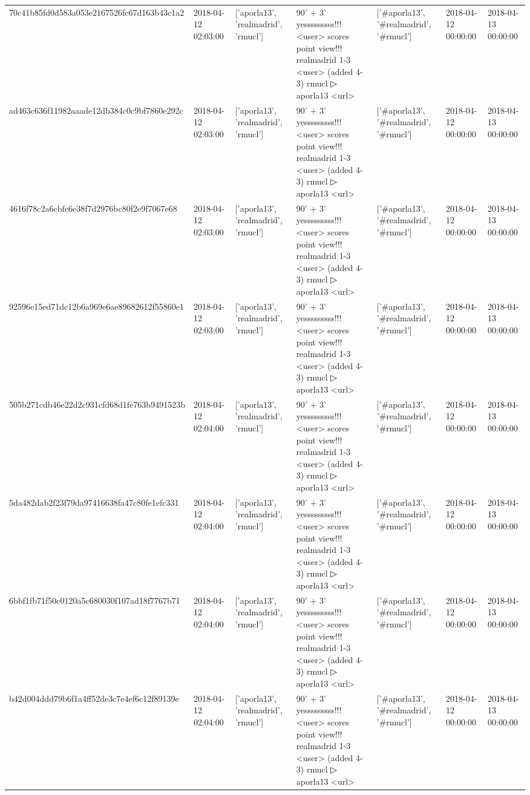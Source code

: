 \begin{tabular}{lllllll}
70c41b85fd0d583a053e2167526fc67d163b43c1a2 & 2018-04-12 02:03:00 & ['aporla13', 'realmadrid', 'rmucl'] & 90' + 3' yesssssssss!!! <user> scores point view!!! realmadrid 1-3 <user> (added 4-3) rmucl ▷ aporla13 <url> & ['#aporla13', '#realmadrid', '#rmucl'] & 2018-04-12 00:00:00 & 2018-04-13 00:00:00 \\
ad463c636f11982aaade12db384c0c9bf7860e292c & 2018-04-12 02:03:00 & ['aporla13', 'realmadrid', 'rmucl'] & 90' + 3' yesssssssss!!! <user> scores point view!!! realmadrid 1-3 <user> (added 4-3) rmucl ▷ aporla13 <url> & ['#aporla13', '#realmadrid', '#rmucl'] & 2018-04-12 00:00:00 & 2018-04-13 00:00:00 \\
4616f78c2a6cbfe6e38f7d2976bc80f2e9f7067e68 & 2018-04-12 02:03:00 & ['aporla13', 'realmadrid', 'rmucl'] & 90' + 3' yesssssssss!!! <user> scores point view!!! realmadrid 1-3 <user> (added 4-3) rmucl ▷ aporla13 <url> & ['#aporla13', '#realmadrid', '#rmucl'] & 2018-04-12 00:00:00 & 2018-04-13 00:00:00 \\
92596e15ed71dc12b6a969e6ae89682612f55860e1 & 2018-04-12 02:03:00 & ['aporla13', 'realmadrid', 'rmucl'] & 90' + 3' yesssssssss!!! <user> scores point view!!! realmadrid 1-3 <user> (added 4-3) rmucl ▷ aporla13 <url> & ['#aporla13', '#realmadrid', '#rmucl'] & 2018-04-12 00:00:00 & 2018-04-13 00:00:00 \\
505b271cdb46e22d2c931cfd68d1fe763b9491523b & 2018-04-12 02:04:00 & ['aporla13', 'realmadrid', 'rmucl'] & 90' + 3' yesssssssss!!! <user> scores point view!!! realmadrid 1-3 <user> (added 4-3) rmucl ▷ aporla13 <url> & ['#aporla13', '#realmadrid', '#rmucl'] & 2018-04-12 00:00:00 & 2018-04-13 00:00:00 \\
5da482dab2f23f79da97416638fa47c80fe1efc331 & 2018-04-12 02:04:00 & ['aporla13', 'realmadrid', 'rmucl'] & 90' + 3' yesssssssss!!! <user> scores point view!!! realmadrid 1-3 <user> (added 4-3) rmucl ▷ aporla13 <url> & ['#aporla13', '#realmadrid', '#rmucl'] & 2018-04-12 00:00:00 & 2018-04-13 00:00:00 \\
6bbf1fb71f50c0120a5c680030f107ad18f7767b71 & 2018-04-12 02:04:00 & ['aporla13', 'realmadrid', 'rmucl'] & 90' + 3' yesssssssss!!! <user> scores point view!!! realmadrid 1-3 <user> (added 4-3) rmucl ▷ aporla13 <url> & ['#aporla13', '#realmadrid', '#rmucl'] & 2018-04-12 00:00:00 & 2018-04-13 00:00:00 \\
b42d004ddd79b6f1a4ff52de3c7e4ef6c12f89139e & 2018-04-12 02:04:00 & ['aporla13', 'realmadrid', 'rmucl'] & 90' + 3' yesssssssss!!! <user> scores point view!!! realmadrid 1-3 <user> (added 4-3) rmucl ▷ aporla13 <url> & ['#aporla13', '#realmadrid', '#rmucl'] & 2018-04-12 00:00:00 & 2018-04-13 00:00:00 \\

\end{tabular}
